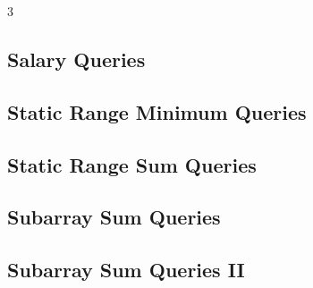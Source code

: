 \documentclass[8pt]{extarticle}
\begin{document}
\begin{multicols*}{3}
\subsection{Salary Queries}
\begin{caixaenunciado}

\end{caixaenunciado}
\vspace{0.3cm}


\subsection{Static Range Minimum Queries}
\begin{caixaenunciado}

\end{caixaenunciado}
\vspace{0.3cm}


\subsection{Static Range Sum Queries}
\begin{caixaenunciado}

\end{caixaenunciado}
\vspace{0.3cm}


\subsection{Subarray Sum Queries}
\begin{caixaenunciado}

\end{caixaenunciado}
\vspace{0.3cm}


\subsection{Subarray Sum Queries II}
\begin{caixaenunciado}

\end{caixaenunciado}
\vspace{0.3cm}



\end{multicols*}
\end{document}
